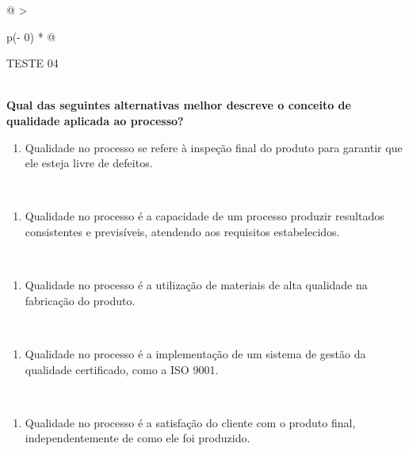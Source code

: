 \documentclass[
]{book}
\providecommand{\tightlist}{%
  \setlength{\itemsep}{0pt}\setlength{\parskip}{0pt}}
\begin{document}
\begin{longtable}[]{@{}
  >{\raggedright\arraybackslash}p{(\columnwidth - 0\tabcolsep) * }@{}}
\toprule\noalign{}
\begin{minipage}[b]{\linewidth}\raggedright
TESTE 04
\end{minipage} \\
\midrule\noalign{}
\endhead
\bottomrule\noalign{}
\endlastfoot
\textbf{Qual das seguintes alternativas melhor descreve o conceito de qualidade aplicada ao processo?} \\
\begin{minipage}[t]{\linewidth}\raggedright
\begin{enumerate}
\def\labelenumi{\alph{enumi})}
\tightlist
\item
  Qualidade no processo se refere à inspeção final do produto para garantir que ele esteja livre de defeitos.
\end{enumerate}
\end{minipage} \\
\begin{minipage}[t]{\linewidth}\raggedright
\begin{enumerate}
\def\labelenumi{\alph{enumi})}
\setcounter{enumi}{1}
\tightlist
\item
  Qualidade no processo é a capacidade de um processo produzir resultados consistentes e previsíveis, atendendo aos requisitos estabelecidos.
\end{enumerate}
\end{minipage} \\
\begin{minipage}[t]{\linewidth}\raggedright
\begin{enumerate}
\def\labelenumi{\alph{enumi})}
\setcounter{enumi}{2}
\tightlist
\item
  Qualidade no processo é a utilização de materiais de alta qualidade na fabricação do produto.
\end{enumerate}
\end{minipage} \\
\begin{minipage}[t]{\linewidth}\raggedright
\begin{enumerate}
\def\labelenumi{\alph{enumi})}
\setcounter{enumi}{3}
\tightlist
\item
  Qualidade no processo é a implementação de um sistema de gestão da qualidade certificado, como a ISO 9001.
\end{enumerate}
\end{minipage} \\
\begin{minipage}[t]{\linewidth}\raggedright
\begin{enumerate}
\def\labelenumi{\alph{enumi})}
\setcounter{enumi}{4}
\tightlist
\item
  Qualidade no processo é a satisfação do cliente com o produto final, independentemente de como ele foi produzido.
\end{enumerate}
\end{minipage} \\
\end{longtable}
\end{document}
